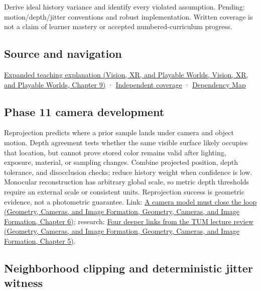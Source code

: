 Derive ideal history variance and identify every violated assumption. Pending: motion/depth/jitter conventions and robust implementation. Written coverage is not a claim of learner mastery or accepted numbered-curriculum progress.

\subsection{Source and navigation}\label{appendix-0727340a4428-source-and-navigation}

\href{../07-Vision-XR-and-Playable-Worlds/main.pdf\#nameddest=04-visual-computing-ii-ch042-temporal-reconstruction-is-an-inference-about-correspondence}{Expanded teaching explanation (Vision, XR, and Playable Worlds, Vision, XR, and Playable Worlds, Chapter 9)} · \hyperref[appendix-fd090d982a15-xr01---independent-seeing-and-representation-source]{Independent coverage} · \hyperref[appendix-4ad47bdd269a]{Dependency Map}

\subsection{Phase 11 camera development}\label{appendix-0727340a4428-phase-11-camera-development}

Reprojection predicts where a prior sample lands under camera and object motion. Depth agreement tests whether the same visible surface likely occupies that location, but cannot prove stored color remains valid after lighting, exposure, material, or sampling changes. Combine projected position, depth tolerance, and disocclusion checks; reduce history weight when confidence is low. Monocular reconstruction has arbitrary global scale, so metric depth thresholds require an external scale or consistent units. Reprojection success is geometric evidence, not a photometric guarantee. Link: \href{../03-Geometry-Cameras-and-Image-Formation/main.pdf\#nameddest=02-foundations-ii-ch037-a-camera-model-must-close-the-loop}{A camera model must close the loop (Geometry, Cameras, and Image Formation, Geometry, Cameras, and Image Formation, Chapter 6)}; research: \href{../03-Geometry-Cameras-and-Image-Formation/main.pdf\#nameddest=02-foundations-ii-ch036-four-deeper-links-from-the-tum-lecture-review}{Four deeper links from the TUM lecture review (Geometry, Cameras, and Image Formation, Geometry, Cameras, and Image Formation, Chapter 5)}.

\subsection{Neighborhood clipping and deterministic jitter witness}\label{appendix-0727340a4428-neighborhood-clipping-and-deterministic-jitter-witness}

